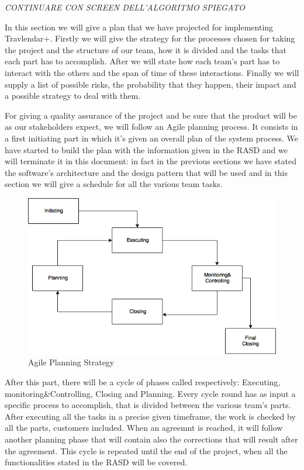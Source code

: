 
\emph{ \huge CONTINUARE CON SCREEN DELL'ALGORITMO SPIEGATO}


In this section we will give a plan that we have projected for implementing Travlendar+. 
Firstly we will give the strategy for the processes chosen for taking the project and the structure of our team, how it is divided and the tasks that each part has to accomplish.
After we will state how each team’s part has to interact with the others and the span of time of these interactions. 
Finally we will supply a list of possible risks, the probability that they happen, their impact and a possible strategy to deal with them.

For giving a quality assurance of the project and be sure that the product will be as our stakeholders expect, we will follow an Agile planning process. It consists in a first initiating part in which it’s given an overall plan of the system process. We have started to build the plan with the information given in the RASD and we will terminate it in this document: in fact in the previous sections we have stated the software’s architecture and the design pattern that will be used and in this section we will give a schedule for all the various team tasks.
\begin{figure}[H]
	\centering
	\includegraphics[scale=0.35]{Images/Implementation/Agile_Planning}
	\caption{Agile Planning Strategy}
\end{figure}
After this part, there will be a cycle of phases called respectively: Executing, monitoring\&Controlling, Closing and Planning. 
Every cycle round has as input a specific process to accomplish, that is divided between the various team’s parts. After executing all the tasks in a precise given timeframe, the work is checked by all the parts, customers included. When an agreemnt is reached, it will follow another planning phase that will contain also the corrections that will result after the agreement.
This cycle is repeated until the end of the project, when all the functionalities stated in the RASD will be covered.


